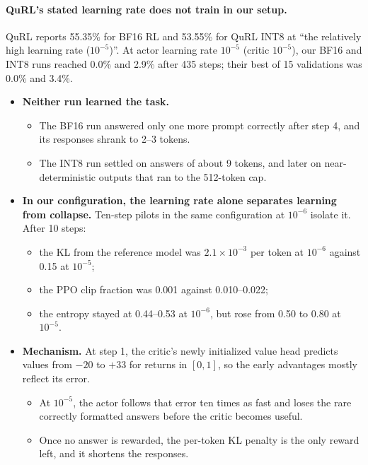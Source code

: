 \paragraph{QuRL's stated learning rate does not train in our setup.} QuRL reports 55.35\% for BF16 RL and 53.55\% for QuRL INT8 at ``the relatively high learning rate ($10^{-5}$)''. At actor learning rate $10^{-5}$ (critic $10^{-5}$), our BF16 and INT8 runs reached 0.0\% and 2.9\% after 435 steps; their best of 15 validations was 0.0\% and 3.4\%.
\begin{itemize}[leftmargin=*,itemsep=2pt]
\item \textbf{Neither run learned the task.}
  \begin{itemize}[leftmargin=*,itemsep=1pt]
  \item The BF16 run answered only one more prompt correctly after step 4, and its responses shrank to 2--3 tokens.
  \item The INT8 run settled on answers of about 9 tokens, and later on near-deterministic outputs that ran to the 512-token cap.
  \end{itemize}
\item \textbf{In our configuration, the learning rate alone separates learning from collapse.} Ten-step pilots in the same configuration at $10^{-6}$ isolate it. After 10 steps:
  \begin{itemize}[leftmargin=*,itemsep=1pt]
  \item the KL from the reference model was $2.1\times10^{-3}$ per token at $10^{-6}$ against 0.15 at $10^{-5}$;
  \item the PPO clip fraction was 0.001 against 0.010--0.022;
  \item the entropy stayed at 0.44--0.53 at $10^{-6}$, but rose from 0.50 to 0.80 at $10^{-5}$.
  \end{itemize}
\item \textbf{Mechanism.} At step 1, the critic's newly initialized value head predicts values from $-20$ to $+33$ for returns in $[0,1]$, so the early advantages mostly reflect its error.
  \begin{itemize}[leftmargin=*,itemsep=1pt]
  \item At $10^{-5}$, the actor follows that error ten times as fast and loses the rare correctly formatted answers before the critic becomes useful.
  \item Once no answer is rewarded, the per-token KL penalty is the only reward left, and it shortens the responses.
  \end{itemize}

\end{itemize}
